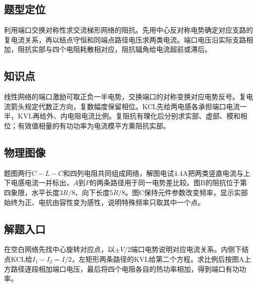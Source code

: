 \documentclass[UTF8,fontset=fandol,a4paper,11pt]{ctexart}
\begin{document}


\subsection*{题型定位}

利用端口交换对称性求交流梯形网络的阻抗。先用中心反对称电势确定对应支路的复电流关系，再以结点守恒和同端点路径电压求两类电流。端口电压沿实际支路相加，阻抗实部与四个电阻耗散相对应，阻抗辐角给电流超前或滞后。



\subsection*{知识点}

线性网络的端口激励可取正负一半电势，交换端口的对称变换对应电势反号。复电流箭头规定代数正方向，复数幅度保留相位。KCL先给两电感各承担端口电流一半，KVL再给外、内电阻电流比例。复阻抗有理化后分别求实部、虚部、模和相位；有效值相量的有功功率为电流模平方乘阻抗实部。



\subsection*{物理图像}

题图两行$C-L-C$和四列电阻共同组成网络，解图电试4.4A把两类竖直电流与上下电感电流一并标出，$A$到$P$的两条路径用于同一电势差比较。图B的阻抗位于第四象限，水平长度$3R/8$、向下长度$5R/8$。图C保持元件参数改变频率，显示实部始终为正、电抗由容性变为感性，说明特殊频率只取其中一个点。



\subsection*{解题入口}

在空白网络先找中心旋转对应点，以$\pm V/2$端口电势说明对应电流关系。内侧下结点KCL给$I_1-I_2=I/2$，左矩形两条路径的KVL给第二个方程。求比例后按图A上方路径逐段相加端口电压，最后将四个电阻各自的热功率相加，得到端口有功功率。

\end{document}
